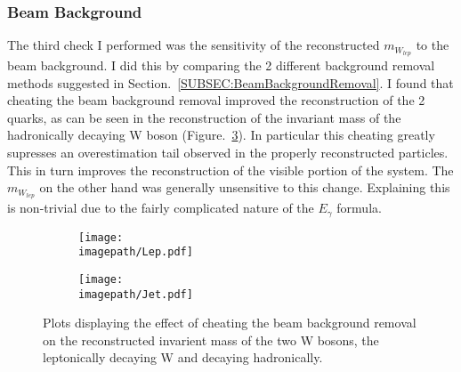\subsubsection{Beam Background}
\label{SUBSUBSEC:BeamBackground}
The third check I performed was the sensitivity of the reconstructed ${m}_{W_{lep}}$  to the beam background. I did this by comparing the 2 different background removal methods suggested in Section.~\ref{SUBSEC:BeamBackgroundRemoval}. I found that cheating the beam background removal improved the reconstruction of the 2 quarks, as can be seen in the reconstruction of the invariant mass of the hadronically decaying W boson (Figure.~\ref{FIG:Cheat}). In particular this cheating greatly supresses an overestimation tail observed in the properly reconstructed particles. This in turn improves the reconstruction of the visible portion of the system. The ${m}_{W_{lep}}$ on the other hand was generally unsensitive to this change. Explaining this is non-trivial due to the fairly complicated nature of the $E_{\gamma}$ formula.
\begin{figure}
    \begin{subfigure}[t]{0.45\textwidth}
      \centering
      \texttt{[image: \\imagepath/Lep.pdf]}
      \caption{}
      \label{SUBFIG:CheatLep}
    \end{subfigure}
    \begin{subfigure}[t]{0.45\textwidth}
      \centering
      \texttt{[image: \\imagepath/Jet.pdf]}
      \caption{}
      \label{SUBFIG:CheatHad}
    \end{subfigure}
    \caption{
        Plots displaying the effect of cheating the beam background removal on the reconstructed invarient mass of the two W bosons,
         the leptonically decaying W and  decaying hadronically.
      }
    \label{FIG:Cheat}
\end{figure}

